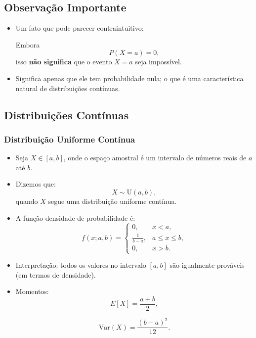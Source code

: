 \documentclass[
  letterpaper,
  DIV=11,
  numbers=noendperiod]{scrreprt}
\begin{document}
\subsection*{Observação Importante}\label{observauxe7uxe3o-importante}

\begin{itemize}
\item
  Um fato que pode parecer contraintuitivo:

  Embora \[P(X = a) = 0,\] isso \textbf{não significa} que o evento
  \(X = a\) seja impossível.
\item
  Significa apenas que ele tem probabilidade nula; o que é uma
  característica natural de distribuições contínuas.
\end{itemize}

\subsection{Distribuições
Contínuas}\label{distribuiuxe7uxf5es-contuxednuas}

\subsubsection*{Distribuição Uniforme
Contínua}\label{distribuiuxe7uxe3o-uniforme-contuxednua}

\begin{itemize}
\item
  Seja \(X \in [a, b]\), onde o espaço amostral é um intervalo de
  números reais de \(a\) até \(b\).
\item
  Dizemos que: \[X \sim \text{U}(a, b),\] quando \(X\) segue uma
  distribuição uniforme contínua.
\item
  A função densidade de probabilidade é: \[f(x; a, b) =
  \begin{cases}
  0, & x < a, \\
  \frac{1}{b - a}, & a \leq x \leq b, \\
  0, & x > b.
  \end{cases}\]
\item
  Interpretação: todos os valores no intervalo \([a, b]\) são igualmente
  prováveis (em termos de densidade).
\item
  Momentos: \[E[X] = \frac{a + b}{2},\]

  \[\text{Var}(X) = \frac{(b - a)^2}{12}.\]
\end{itemize}
\end{document}
